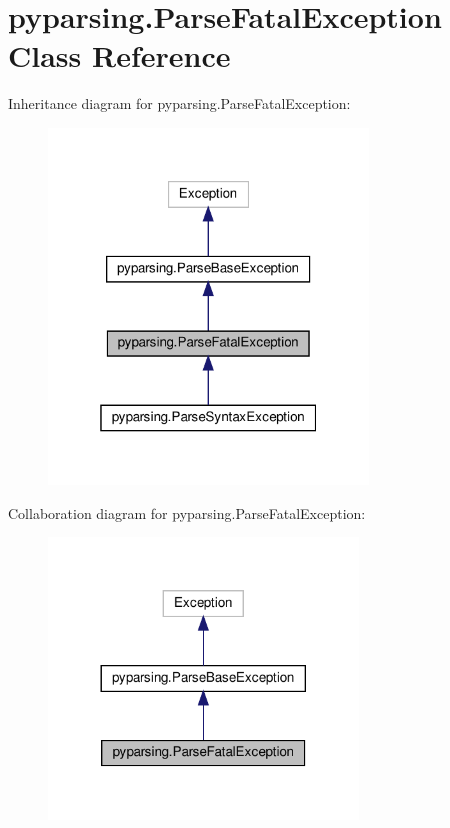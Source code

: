 \hypertarget{classpyparsing_1_1ParseFatalException}{}\section{pyparsing.\+Parse\+Fatal\+Exception Class Reference}
\label{classpyparsing_1_1ParseFatalException}


Inheritance diagram for pyparsing.\+Parse\+Fatal\+Exception\+:
\nopagebreak
\begin{figure}[H]
\begin{center}
\leavevmode
\includegraphics[width=241pt]{classpyparsing_1_1ParseFatalException__inherit__graph}
\end{center}
\end{figure}


Collaboration diagram for pyparsing.\+Parse\+Fatal\+Exception\+:
\nopagebreak
\begin{figure}[H]
\begin{center}
\leavevmode
\includegraphics[width=233pt]{classpyparsing_1_1ParseFatalException__coll__graph}
\end{center}
\end{figure}
